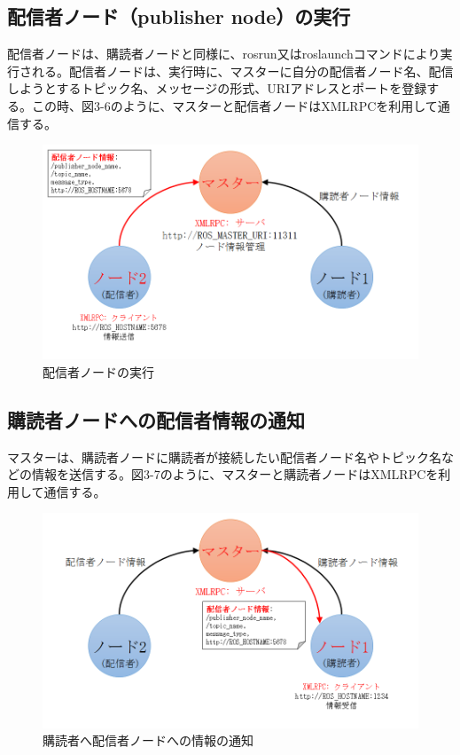 \subsection{配信者ノード（publisher node）の実行}
配信者ノードは、購読者ノードと同様に、rosrun又はroslaunchコマンドにより実行される。配信者ノードは、実行時に、マスターに自分の配信者ノード名、配信しようとするトピック名、メッセージの形式、URIアドレスとポートを登録する。この時、図3-6のように、マスターと配信者ノードはXMLRPCを利用して通信する。

\begin{figure}[h]
  \centering
  \includegraphics[width=12cm]{pictures/chapter3/pic_03_06.png}
  \caption{配信者ノードの実行}
\end{figure}

\subsection{購読者ノードへの配信者情報の通知}
マスターは、購読者ノードに購読者が接続したい配信者ノード名やトピック名などの情報を送信する。図3-7のように、マスターと購読者ノードはXMLRPCを利用して通信する。

\begin{figure}[h]
  \centering
  \includegraphics[width=12cm]{pictures/chapter3/pic_03_07.png}
  \caption{購読者へ配信者ノードへの情報の通知}
\end{figure}

